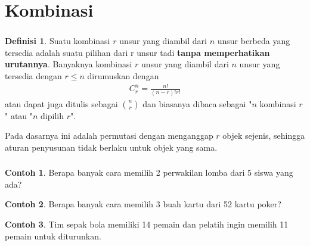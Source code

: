 \documentclass[aspectratio=169]{beamer}
\theoremstyle{definition}
\newtheorem{definisi}{Definisi}
\newtheorem{contoh}{Contoh}
\begin{document}

\section{Kombinasi}
\begin{frame}
\frametitle{\insertsection}
\begin{definisi}
  Suatu kombinasi $r$ unsur yang diambil dari $n$ unsur berbeda yang tersedia adalah suatu pilihan dari r unsur tadi\textbf{ tanpa memperhatikan urutannya}. Banyaknya kombinasi $r$ unsur yang diambil dari $n$ unsur yang tersedia dengan $r \leq n$ dirumuskan dengan
  \begin{align}
      C_r^n=\frac{n!}{(n-r)!r!}
  \end{align}
  atau dapat juga ditulis sebagai $\displaystyle \binom{n}{r}$ dan biasanya dibaca sebagai "$n$ kombinasi $r$" atau "$n$ dipilih $r$".
\end{definisi}
Pada dasarnya ini adalah permutasi dengan menganggap $r$ objek sejenis, sehingga aturan penyusunan tidak berlaku untuk objek yang sama.
\end{frame}

\begin{frame}
  \frametitle{\insertsection}
  \begin{contoh}
    Berapa banyak cara memilih 2 perwakilan lomba dari 5 siswa yang ada?
  \end{contoh}
  \begin{contoh}
    Berapa banyak cara memilih 3 buah kartu dari 52 kartu poker?
  \end{contoh}
  \begin{contoh}
    Tim sepak bola memiliki 14 pemain dan pelatih ingin memilih 11 pemain untuk diturunkan.
  \end{contoh}
\end{frame}
\end{document}
